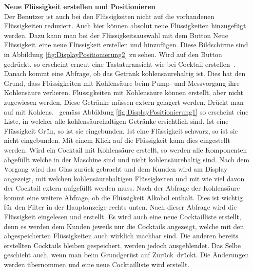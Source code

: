 \textbf{Neue Flüssigkeit erstellen und Positionieren}\\
Der Benutzer ist auch bei den Flüssigkeiten nicht auf die vorhandenen Flüssigkeiten reduziert. Auch hier können absolut neue Flüssigkeiten hinzugefügt werden. Dazu kann man bei der Flüssigkeitsauswahl mit dem Button \flqq Neue Flüssigkeit\frqq~eine neue Flüssigkeit erstellen und hinzufügen. Diese Bildschirme sind in Abbildung \ref{fig:DisplayPositionierung2} zu sehen. Wird auf den Button gedrückt, so erscheint erneut eine Tastaturansicht wie bei \flqq Cocktail erstellen\frqq~. Danach kommt eine Abfrage, ob das Getränk kohlensäurehaltig ist. Dies hat den Grund, dass Flüssigkeiten mit Kohlensäure beim Pump- und Messvorgang ihre Kohlensäure verlieren. Flüssigkeiten mit Kohlensäure können erstellt, aber nicht zugewiesen werden. Diese Getränke müssen extern gelagert werden. Drückt man auf  \flqq mit Kohlens.\frqq~ gemäss Abbildung \ref{fig:DisplayPositionierung1} so erscheint eine Liste, in welcher alle kohlensäurehaltigen Getränke ersichtlich sind. Ist eine Flüssigkeit Grün, so ist sie eingebunden. Ist eine Flüssigkeit schwarz, so ist sie nicht eingebunden. Mit einem Klick auf die Flüssigkeit kann dies eingestellt werden. Wird ein Cocktail mit Kohlensäure erstellt, so werden alle Komponenten abgefüllt welche in der Maschine sind und nicht kohlensäurehaltig sind. Nach dem Vorgang wird das Glas zurück gebracht und dem Kunden wird am Display angezeigt, mit welchen kohlensäurehaltigen Flüssigkeiten und mit wie viel davon der Cocktail extern aufgefüllt werden muss. Nach der Abfrage der Kohlensäure kommt eine weitere Abfrage, ob die Flüssigkeit Alkohol enthält. Dies ist wichtig für den Filter in der Hauptanzeige rechts unten. Nach dieser Abfrage wird die Flüssigkeit eingelesen und erstellt. Es wird auch eine  neue Cocktailliste erstellt, denn es werden dem Kunden jeweils nur die Cocktails angezeigt, welche mit den abgespeicherten Flüssigkeiten auch wirklich machbar sind. Die anderen bereits erstellten Cocktails bleiben gespeichert, werden jedoch ausgeblendet. Das Selbe geschieht auch, wenn man beim Grundgerüst auf \flqq Zurück\frqq~drückt. Die Änderungen werden übernommen und eine neue Cocktailliste wird erstellt.

